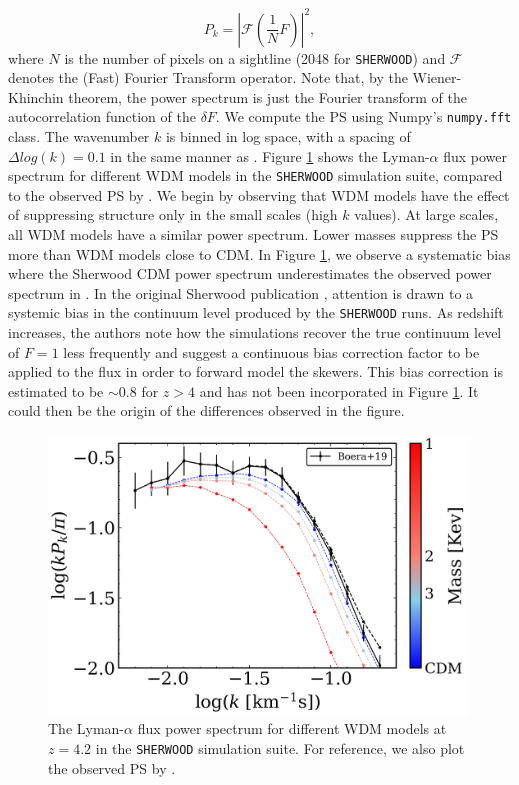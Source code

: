 \begin{equation}\label{eq: PS def}
        P_k = \left| \mathcal{F}(\frac{1}{N} F)  \right| ^2,
\end{equation}
where $N$ is the number of pixels on a sightline (2048 for \texttt{SHERWOOD}) and $\mathcal{F}$ denotes the (Fast) Fourier Transform operator. Note that, by the Wiener-Khinchin theorem, the power spectrum is just the Fourier transform of the autocorrelation function of the $\delta F$. We compute the PS using Numpy's \texttt{numpy.fft} class. The wavenumber $k$ is binned in log space, with a spacing of $\Delta log(k)=0.1$ in the same manner as \cite{Boera_2019}. Figure \ref{fig: sherwood exact PS} shows the Lyman-$\alpha$ flux power spectrum for different WDM models in the \texttt{SHERWOOD} simulation suite, compared to the observed PS by \cite{Boera_2019}. We begin by observing that WDM models have the effect of suppressing structure only in the small scales (high $k$ values). At large scales, all WDM models have a similar power spectrum. Lower masses suppress the PS more than WDM models close to CDM.
In Figure \ref{fig: sherwood exact PS}, we observe a systematic bias where the Sherwood CDM power spectrum underestimates the observed power spectrum in \cite{Boera_2019}. In the original Sherwood publication \cite{Bolton_2016}, attention is drawn to a systemic bias in the continuum level produced by the \texttt{SHERWOOD} runs. As redshift increases, the authors note how the simulations recover the true continuum level of $F=1$ less frequently and suggest a continuous bias correction factor to be applied to the flux in order to forward model the skewers. This bias correction is estimated to be $\sim 0.8$ for $z>4$ and has not been incorporated in Figure \ref{fig: sherwood exact PS}. It could then be the origin of the differences observed in the figure.

\begin{figure}[ht]
        \centering
        \includegraphics[width=0.99\textwidth]{img/ML/PS_sherwood.png}
        \caption{The Lyman-$\alpha$ flux power spectrum for different WDM models at $z=4.2$ in the \texttt{SHERWOOD} simulation suite. For reference, we also plot the observed PS by \cite{Boera_2019}.}
        \label{fig: sherwood exact PS}     
\end{figure}


